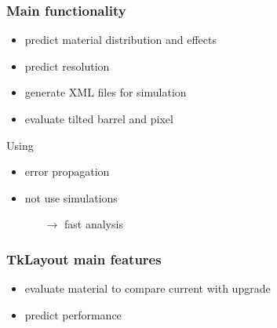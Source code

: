 \documentclass[pdftex, 11pt]{beamer}
\begin{document}
\begin{frame}
  \frametitle{Main functionality}
  \begin{itemize}
  \item predict \alert{material} distribution and effects
    \pause
  \item predict \alert{resolution}
    \pause
  \item generate \alert{XML} files for simulation
    \pause
  \item evaluate \alert{tilted} barrel and \alert{pixel}
  \end{itemize}
  \pause
  \begin{block}{Using}
    \begin{itemize}
    \item error \alert{propagation}
    \item \alert{not} use simulations
      \begin{itemize}
      \item[$\rightarrow$] \alert{fast} analysis
      \end{itemize}
    \end{itemize}
  \end{block}
\end{frame}

\begin{frame}
  \frametitle{TkLayout main features}
  \begin{itemize}
  \item<1-> evaluate material to \alert{compare} current with upgrade
  \item<2-> predict \alert{performance}
  \end{itemize}
  \begin{center}
  \end{center}
\end{frame}
\end{document}
